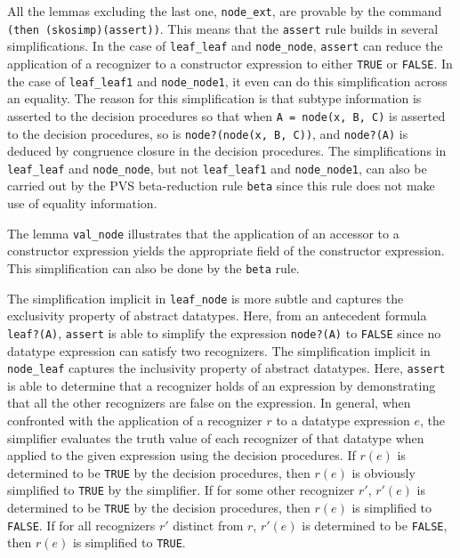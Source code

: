 \documentclass[11pt,twoside]{book}
\begin{document}
All the lemmas excluding the  last one, \texttt{node\_ext},  are provable
by the command \texttt{(then (skosimp)(assert))}.  This means that the
\texttt{assert} rule builds in several simplifications.  In the case of
\texttt{leaf\_leaf} and \texttt{node\_node}, \texttt{assert} can reduce the
application of a recognizer to a constructor expression to either \texttt{TRUE} or \texttt{FALSE}.  In the case of \texttt{leaf\_leaf1} and \texttt{node\_node1}, it even can do this simplification across an equality.
The reason for this simplification is that subtype information
is asserted to the decision procedures so that when \texttt{A = node(x, B,
C)} is asserted to the decision procedures, so is \texttt{node?(node(x, B, C))},
and \texttt{node?(A)} is deduced by congruence closure in the decision
procedures.  
The simplifications in \texttt{leaf\_leaf} and \texttt{node\_node}, but not
\texttt{leaf\_leaf1} and \texttt{node\_node1}, can also be carried out by the
PVS beta-reduction rule \texttt{beta} since this rule does not make use of
equality information\@.

The lemma \texttt{val\_node} illustrates that the application of an
accessor to a constructor expression yields the appropriate field of
the constructor expression.  This simplification can also be done by
the \texttt{beta} rule.

The simplification implicit in \texttt{leaf\_node}
is more subtle and captures the exclusivity property of abstract
datatypes.  Here, from an antecedent formula \texttt{leaf?(A)},  \texttt{assert} is able to simplify the expression \texttt{node?(A)} to \texttt{FALSE}
since no datatype expression can satisfy two recognizers.
The simplification implicit in \texttt{node\_leaf} captures the
inclusivity property of abstract datatypes.  Here, \texttt{assert} is
able to determine that a recognizer  holds of an expression  by
demonstrating that all the other recognizers are false on the expression.
In general, when confronted with the application of a recognizer $r$ to a
datatype expression $e$, the simplifier evaluates the truth value of
each recognizer of that datatype when applied to the given expression
using the decision procedures.  If $r(e)$ is determined to be \texttt{TRUE}
by the decision procedures, then $r(e)$ is obviously simplified to \texttt{TRUE} by the simplifier\@.  If for some other recognizer $r'$,
$r'(e)$ is determined to be \texttt{TRUE} by the decision procedures, 
then $r(e)$ is simplified to \texttt{FALSE}.  If for all recognizers $r'$
distinct from $r$, $r'(e)$ is determined to be \texttt{FALSE}, then
$r(e)$ is simplified to \texttt{TRUE}\@.  
\end{document}
